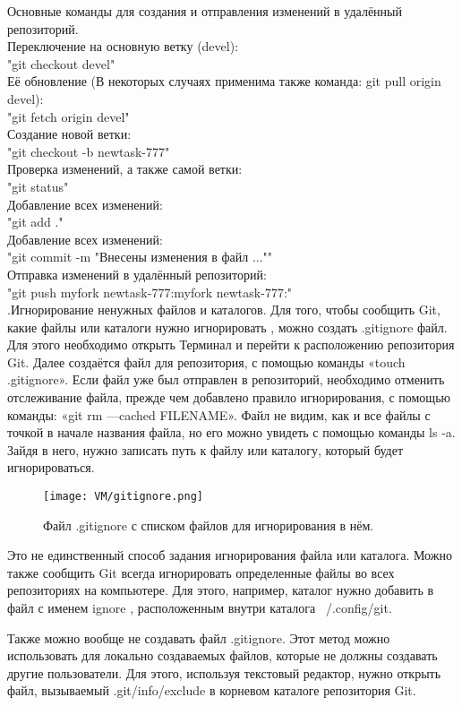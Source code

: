 \quad Основные команды для создания и отправления изменений в удалённый репозиторий.
\\ \quad Переключение на основную ветку (devel):
\\ "git checkout devel"
\\ \quad Её обновление (В некоторых случаях применима также команда: git pull origin devel):
\\ "git fetch origin devel"
\\ \quad Создание новой ветки:
\\ "git checkout -b newtask-777"
\\ \quad Проверка изменений, а также самой ветки:
\\ "git status"
\\ \quad Добавление всех изменений:
\\ "git add ."
\\ \quad Добавление всех изменений:
\\ "git commit -m "Внесены изменения в файл ...""
\\ \quad Отправка изменений в удалённый репозиторий:
\\ "git push myfork newtask-777:myfork newtask-777:"
\\

.\quad  Игнорирование ненужных файлов и каталогов.
\newline \quad Для того, чтобы сообщить Git, какие файлы или каталоги нужно игнорировать , можно создать .gitignore файл.
\newline Для этого необходимо открыть Терминал и перейти к расположению репозитория Git. Далее создаётся файл для репозитория, с помощью команды «touch .gitignore».
\newline Если файл уже был отправлен в репозиторий, необходимо отменить отслеживание файла, прежде чем добавлено правило игнорирования, с помощью команды: «git rm —cached FILENAME».
\newline Файл не видим, как и все файлы с точкой в начале названия файла, но его можно увидеть с помощью команды ls -a. Зайдя в него, нужно записать путь к файлу или каталогу, который будет игнорироваться.

\begin{figure}[h]
		\centering
		\texttt{[image: VM/gitignore.png]}
\caption{Файл .gitignore с списком файлов для игнорирования в нём.}
\label{ris:image}
\end{figure}

\quad Это не единственный способ задания игнорирования файла или каталога.
\newline Можно также сообщить Git всегда игнорировать определенные файлы во всех репозиториях на компьютере. Для этого, например, каталог нужно добавить в файл с именем ignore , расположенным внутри каталога ~/.config/git.

\quad Также можно вообще не создавать файл .gitignore. 
\newline Этот метод можно использовать для локально создаваемых файлов, которые не должны создавать другие пользователи. Для этого, используя текстовый редактор, нужно открыть файл, вызываемый .git/info/exclude в корневом каталоге репозитория Git.